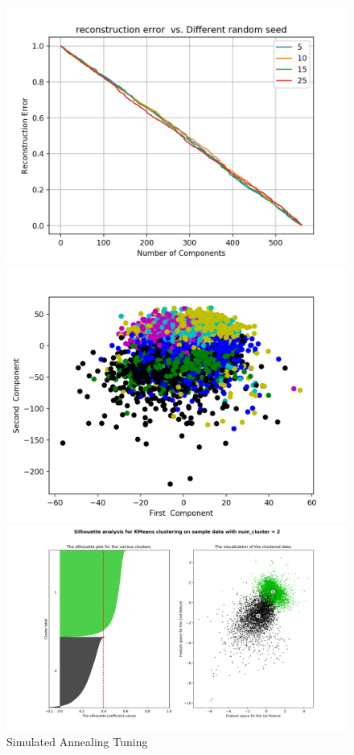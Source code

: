 \documentclass[a4paper,12pt]{article}
\begin{document}
\begin{figure}[!htb]
   \begin{minipage}{0.33\textwidth}
     \centering
     \includegraphics[width=.95\linewidth]{rp_dataset2}
   \end{minipage}\hfill
    \begin{minipage}{0.33\textwidth}
     \centering
     \includegraphics[width=.95\linewidth]{rp_dataset2_visual}
     \end{minipage}\hfill
     \begin{minipage}{0.33\textwidth}
     \centering
     \includegraphics[width=.95\linewidth]{rp_dataset2_kmeans_visual_sil}
   \end{minipage}\hfill
 \caption { Simulated Annealing Tuning}
\end{figure}
\end{document}
